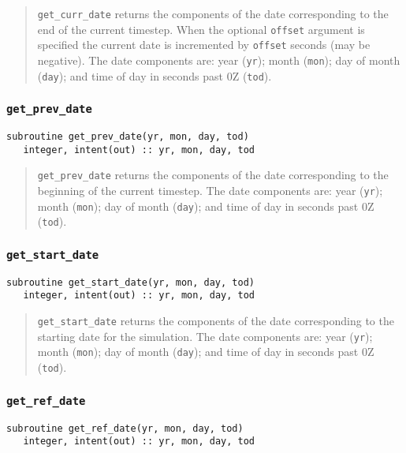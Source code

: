 \documentclass[12pt]{article}
\newcommand{\code}[1]{\texttt{#1}}
\begin{document}
\begin{quote}
\code{get\_curr\_date} returns the components of the date corresponding to
the end of the current timestep.  When the optional \code{offset} argument
is specified the current date is incremented by \code{offset} seconds (may
be negative).
The date components are: year (\code{yr}); month (\code{mon}); day of
month (\code{day}); and time of day in seconds past 0Z (\code{tod}).
\end{quote}

\subsubsection{\code{get\_prev\_date}}
\begin{verbatim}
subroutine get_prev_date(yr, mon, day, tod)
   integer, intent(out) :: yr, mon, day, tod
\end{verbatim}

\begin{quote}
\code{get\_prev\_date} returns the components of the date corresponding to
the beginning of the current timestep.
The date components are: year (\code{yr}); month (\code{mon}); day of
month (\code{day}); and time of day in seconds past 0Z (\code{tod}).
\end{quote}

\subsubsection{\code{get\_start\_date}}
\begin{verbatim}
subroutine get_start_date(yr, mon, day, tod)
   integer, intent(out) :: yr, mon, day, tod
\end{verbatim}

\begin{quote}
\code{get\_start\_date} returns the components of the date corresponding to
the starting date for the simulation.
The date components are: year (\code{yr}); month (\code{mon}); day of
month (\code{day}); and time of day in seconds past 0Z (\code{tod}).
\end{quote}

\subsubsection{\code{get\_ref\_date}}
\begin{verbatim}
subroutine get_ref_date(yr, mon, day, tod)
   integer, intent(out) :: yr, mon, day, tod
\end{verbatim}
\end{document}
